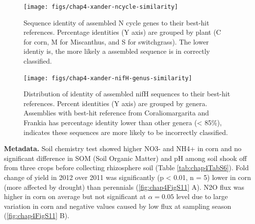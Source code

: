 \documentclass[]{msu-thesis}
\begin{document}
\begin{figure}[tbph!]
  \centering
  \texttt{[image: figs/chap4-xander-ncycle-similarity]}
  \caption[Identity of assembled N cycle genes to their best-hit references]{Sequence identity of assembled N cycle genes to their best-hit references. Percentage identities (Y axis) are grouped by plant (C for corn, M for Miscanthus, and S for switchgrass). The lower identiy is, the more likely a assembled sequence is in correctly classified.}
  \label{fig:chap4FigS9}
\end{figure}


\begin{figure}[tbph!]
  \centering
  \texttt{[image: figs/chap4-xander-nifH-genus-similarity]}
  \caption[Identity of assembled nifH sequences to their best-hit references]{Distribution of identity of assembled nifH sequences to their best-hit references. Percent identities (Y axis) are grouped by genera. Assemblies with best-hit reference from Coraliomargarita and Frankia has percentage identity lower than other genera (< 85\%), indicates these sequences are more likely to be incorrectly classified.}
  \label{fig:chap4FigS10}
\end{figure}

\textbf{Metadata. }
Soil chemistry test showed higher NO3- and NH4+ in corn and no significant difference in SOM (Soil Organic Matter) and pH among soil shook off from three crops before collecting rhizosphere soil (Table \ref{tab:chap4TabS6}). Fold change of yield in 2012 over 2011 was significantly (p < 0.01, n = 5) lower in corn (more affected by drought) than perennials (\cref{fig:chap4FigS11} A). N2O flux was higher in corn on average but not significant at $\alpha = 0.05$ level due to large variation in corn and negative values caused by low flux at sampling season (\cref{fig:chap4FigS11} B).
\end{document}
